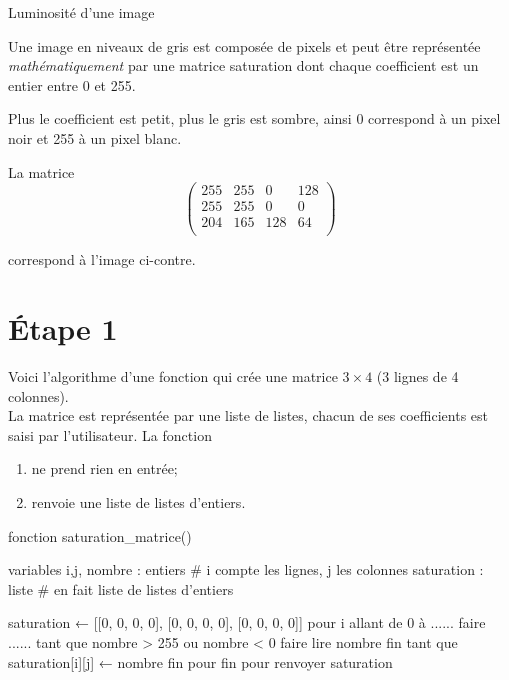 
\begin{center}
		{\Huge\titlefont\color{UGLiBlue} Luminosité d'une image}
\end{center}

Une image en niveaux de gris est composée de pixels et peut être représentée \textit{mathématiquement} par une matrice \og saturation\fg{} dont chaque coefficient est un entier entre 0 et 255.

Plus le coefficient est petit, plus le gris est sombre, ainsi 0 correspond à un pixel noir et 255 à un pixel blanc.

\begin{multicols}{2}
La matrice
$$\begin{pmatrix}
255&255&0&128\\
255&255&0&0\\
204&165&128&64\\
\end{pmatrix}$$

correspond à l'image ci-contre.
\columnbreak
\begin{center}
\end{center}
\end{multicols}
\section*{\'Etape 1}

Voici l'algorithme d'une fonction qui crée une matrice $3\times 4$ (3 lignes de 4 colonnes).\\
La matrice est représentée par une liste de listes, chacun de ses coefficients est saisi par l'utilisateur. La fonction
\begin{enumerate}[--]
	\item ne prend rien en entrée;
    \item renvoie une liste de listes d'entiers.
\end{enumerate}
\begin{algo}    
fonction saturation_matrice()
    
    variables
        i,j, nombre : entiers # i compte les lignes, j les colonnes
        saturation  : liste  # en fait liste de listes d'entiers

    saturation ← [[0, 0, 0, 0], [0, 0, 0, 0], [0, 0, 0, 0]]
    pour i allant de 0 à ...... faire
        ......
            tant que nombre > 255 ou nombre < 0 faire
                lire nombre
            fin tant que
            saturation[i][j] ← nombre
        fin pour
    fin pour
    renvoyer saturation
\end{algo}

